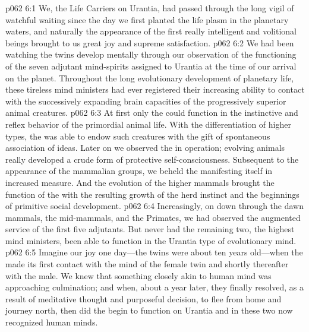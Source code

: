 %
\vs p062 6:1 We, the Life Carriers on Urantia, had passed through the long vigil of watchful waiting since the day we first planted the life plasm in the planetary waters, and naturally the appearance of the first really intelligent and volitional beings brought to us great joy and supreme satisfaction.
\vs p062 6:2 We had been watching the twins develop mentally through our observation of the functioning of the seven adjutant mind\hyp{}spirits assigned to Urantia at the time of our arrival on the planet. Throughout the long evolutionary development of planetary life, these tireless mind ministers had ever registered their increasing ability to contact with the successively expanding brain capacities of the progressively superior animal creatures.
\vs p062 6:3 At first only the  could function in the instinctive and reflex behavior of the primordial animal life. With the differentiation of higher types, the  was able to endow such creatures with the gift of spontaneous association of ideas. Later on we observed the  in operation; evolving animals really developed a crude form of protective self\hyp{}consciousness. Subsequent to the appearance of the mammalian groups, we beheld the  manifesting itself in increased measure. And the evolution of the higher mammals brought the function of the  with the resulting growth of the herd instinct and the beginnings of primitive social development.
\vs p062 6:4 Increasingly, on down through the dawn mammals, the mid\hyp{}mammals, and the Primates, we had observed the augmented service of the first five adjutants. But never had the remaining two, the highest mind ministers, been able to function in the Urantia type of evolutionary mind.
\vs p062 6:5 Imagine our joy one day---the twins were about ten years old---when the  made its first contact with the mind of the female twin and shortly thereafter with the male. We knew that something closely akin to human mind was approaching culmination; and when, about a year later, they finally resolved, as a result of meditative thought and purposeful decision, to flee from home and journey north, then did the  begin to function on Urantia and in these two now recognized human minds.
